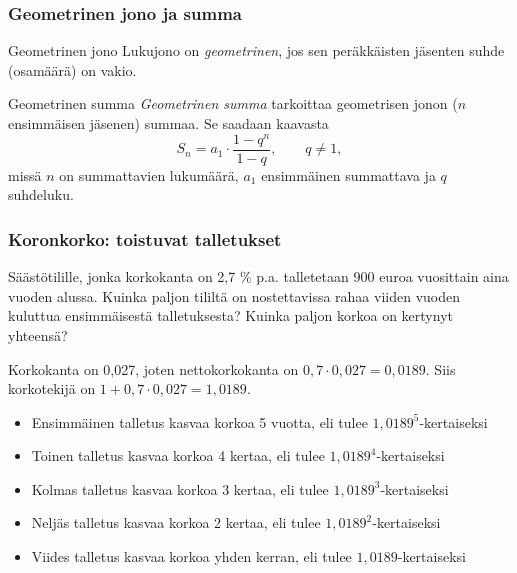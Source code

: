\documentclass{beamer}
\begin{document}
\begin{frame}
    \frametitle{Geometrinen jono ja summa}
    \pause
    \begin{block}{Geometrinen jono}
        Lukujono on \emph{geometrinen}, jos sen peräkkäisten jäsenten suhde (osamäärä) on vakio.
    \end{block}
    \pause
    \begin{block}{Geometrinen summa}
        \emph{Geometrinen summa} tarkoittaa geometrisen jonon ($n$ ensimmäisen jäsenen) summaa. Se saadaan kaavasta
        \[
            S_n = a_1\cdot \frac{1-q^n}{1-q}, \qquad q\neq 1,
        \] \pause
        missä \(n\) on summattavien lukumäärä,
        \pause \(a_1\) ensimmäinen summattava
        \pause ja \(q\) suhdeluku.
    \end{block}
\end{frame}

\begin{frame}
\frametitle{Koronkorko: toistuvat talletukset}
	\begin{esim}
		Säästötilille, jonka korkokanta on 2,7 \% p.a. talletetaan 900 euroa vuosittain aina vuoden alussa.
		Kuinka paljon tililtä on nostettavissa rahaa viiden vuoden kuluttua ensimmäisestä talletuksesta?
		Kuinka paljon korkoa on kertynyt yhteensä?
	\end{esim}
\end{frame}

\begin{frame}
	\begin{ratkaisu}
		Korkokanta on 0,027, joten nettokorkokanta on \(0,7\cdot0,027 = 0,0189\).
		Siis korkotekijä on \(1+0,7\cdot0,027 =	1,0189\).
		\begin{itemize}
		    \item Ensimmäinen talletus kasvaa korkoa 5 vuotta, eli tulee \(1,0189^5\)-kertaiseksi\pause
		    \item Toinen talletus kasvaa korkoa 4 kertaa, eli tulee \(1,0189^4\)-kertaiseksi\pause
		    \item Kolmas talletus kasvaa korkoa 3 kertaa, eli tulee \(1,0189^3\)-kertaiseksi\pause
		    \item Neljäs talletus kasvaa korkoa 2 kertaa, eli tulee \(1,0189^2\)-kertaiseksi\pause
		    \item Viides talletus kasvaa korkoa yhden kerran, eli tulee \(1,0189\)-kertaiseksi
		\end{itemize}
	\end{ratkaisu}
\end{frame}
\end{document}
